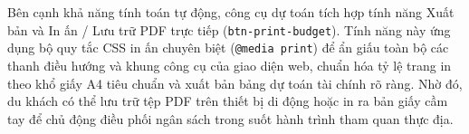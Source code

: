 Bên cạnh khả năng tính toán tự động, công cụ dự toán tích hợp tính năng Xuất bản và In ấn / Lưu trữ PDF trực tiếp (\texttt{btn-print-budget}). Tính năng này ứng dụng bộ quy tắc CSS in ấn chuyên biệt (\texttt{@media print}) để ẩn giấu toàn bộ các thanh điều hướng và khung công cụ của giao diện web, chuẩn hóa tỷ lệ trang in theo khổ giấy A4 tiêu chuẩn và xuất bản bảng dự toán tài chính rõ ràng. Nhờ đó, du khách có thể lưu trữ tệp PDF trên thiết bị di động hoặc in ra bản giấy cầm tay để chủ động điều phối ngân sách trong suốt hành trình tham quan thực địa.

